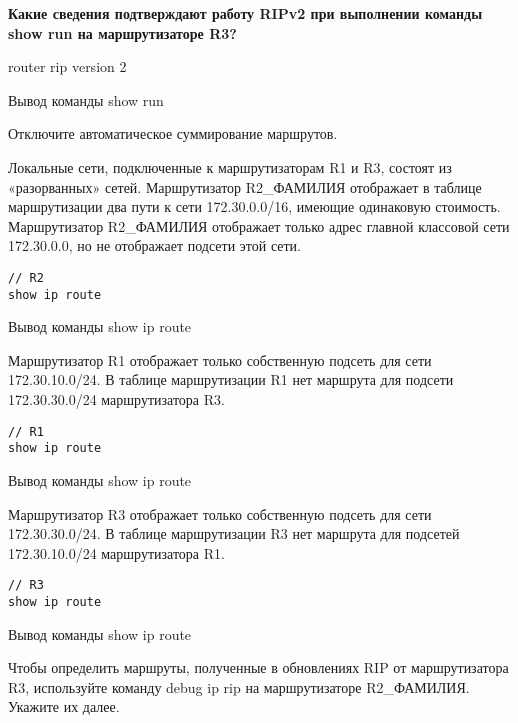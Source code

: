 \textbf{Какие сведения подтверждают работу RIPv2
при выполнении команды show run на маршрутизаторе R3?}

router rip
version 2

\begin{image}
    \caption{Вывод команды show run}
\end{image}

Отключите автоматическое суммирование маршрутов.

Локальные сети, подключенные к маршрутизаторам R1 и R3,
состоят из «разорванных» сетей. Маршрутизатор R2\_ФАМИЛИЯ отображает
в таблице маршрутизации два пути к сети 172.30.0.0/16,
имеющие одинаковую стоимость. Маршрутизатор R2\_ФАМИЛИЯ отображает
только адрес главной классовой сети 172.30.0.0,
но не отображает подсети этой сети.

\begin{verbatim}
// R2
show ip route
\end{verbatim}

\begin{image}
    \caption{Вывод команды show ip route}
\end{image}

Маршрутизатор R1 отображает только собственную подсеть
для сети 172.30.10.0/24. В таблице маршрутизации R1 нет маршрута
для подсети 172.30.30.0/24 маршрутизатора R3.

\begin{verbatim}
// R1
show ip route
\end{verbatim}

\begin{image}
    \caption{Вывод команды show ip route}
\end{image}

Маршрутизатор R3 отображает только собственную подсеть
для сети 172.30.30.0/24. В таблице маршрутизации R3 нет маршрута
для подсетей 172.30.10.0/24 маршрутизатора R1.

\begin{verbatim}
// R3
show ip route
\end{verbatim}

\begin{image}
    \caption{Вывод команды show ip route}
\end{image}

Чтобы определить маршруты, полученные в обновлениях RIP от маршрутизатора R3,
используйте команду debug ip rip на маршрутизаторе R2\_ФАМИЛИЯ.
Укажите их далее.

